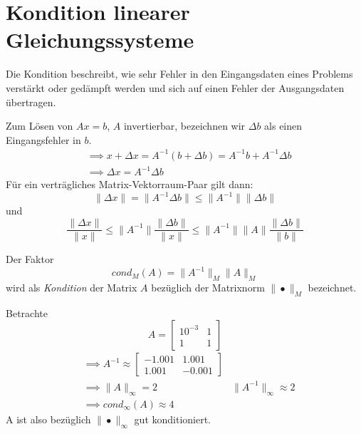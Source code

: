 \section{Kondition linearer Gleichungssysteme}
\begin{recall}
Die Kondition beschreibt, wie sehr Fehler in den Eingangsdaten eines Problems
verstärkt oder gedämpft werden und sich auf einen Fehler der Ausgangsdaten übertragen.
\end{recall}
Zum Lösen von $Ax=b$, $A$ invertierbar, bezeichnen wir $\Delta b$ als einen Eingangsfehler in $b$. 
\begin{align*}
&\implies x+ \Delta x = A^{-1}(b+\Delta b) = A^{-1}b +A^{-1} \Delta b \\
&\implies \Delta x= A^{-1} \Delta b
\end{align*}
Für ein verträgliches Matrix-Vektorraum-Paar gilt dann: 
\[
\|\Delta x\|= \|A^{-1} \Delta b\| \le \|A^{-1}\|\|\Delta b\| 
\]
und 
\[
	\frac{\|\Delta x\|}{\|x\|} \le \|A^{-1}\| \frac{\|\Delta b\|}{\|x\|}\le  \|A^{-1}\| \|A\| \frac{\|\Delta b\|}{\|b\|}
\]
\begin{definition}
Der Faktor 
\[
cond_M (A) = \|A^{-1}\|_M \|A\|_M 
\]
wird als \emph{Kondition} der Matrix $A$ bezüglich der Matrixnorm $\|•\|_M$ bezeichnet. 
\end{definition}
\begin{example}
Betrachte 
\[
A= \begin{bmatrix}
	10^{-3} & 1 \\
	1 & 1
\end{bmatrix}
\]
\begin{align*}
	&\implies A^{-1} \approx \begin{bmatrix}
		-1.001 & 1.001 \\
		1.001 & -0.001
	\end{bmatrix} \\
	&\implies \|A\|_{\infty} =2 & \|A^{-1}\|_{\infty} \approx 2 \\
	&\implies cond_{\infty}(A) \approx 4
\end{align*}
A ist also bezüglich $\|•\|_{\infty}$ gut konditioniert.
\end{example}
